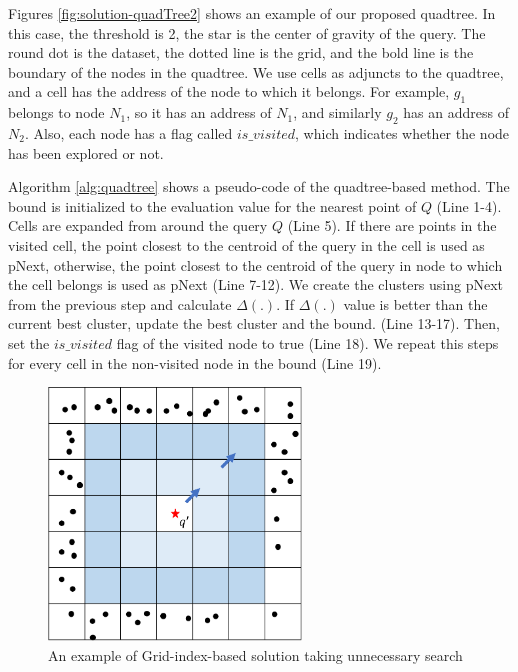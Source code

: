 \documentclass[a4paper,11pt]{report}
\theoremstyle{mytheoremstyle}
\begin{document}
Figures \ref{fig:solution-quadTree2} shows an example of our proposed quadtree. In this case, the threshold is 2, the star is the center of gravity of the query. The round dot is the dataset, the dotted line is the grid, and the bold line is the boundary of the nodes in the quadtree. We use cells as adjuncts to the quadtree, and a cell has the address of the node to which it belongs. For example, $g_1$ belongs to node $N_1$, so it has an address of $N_1$, and similarly $g_2$ has an address of $N_2$. Also, each node has a flag called $is\_visited$, which indicates whether the node has been explored or not.

Algorithm \ref{alg:quadtree} shows a pseudo-code of the quadtree-based method. The bound is initialized to the evaluation value for the nearest point of $Q$ (Line 1-4). Cells are expanded from around the query $Q$ (Line 5). If there are points in the visited cell, the point closest to the centroid of the query in the cell is used as pNext, otherwise, the point closest to the centroid of the query in node to which the cell belongs is used as pNext (Line 7-12). We create the clusters using pNext from the previous step and calculate $\Delta(.)$. If $\Delta(.)$ value is better than the current best cluster, update the best cluster and the bound. (Line 13-17). Then, set the $is\_visited$ flag of the visited node to true (Line 18). We repeat this steps for every cell in the non-visited node in the bound (Line 19).

\begin{figure}
    \begin{center}
        \includegraphics[width=0.6\textwidth]{images/solution-QuadTree1.pdf}
        \caption{An example of Grid-index-based solution taking unnecessary search} \label{fig:solution-quadTree1}
    \end{center}
\end{figure}
\end{document}
